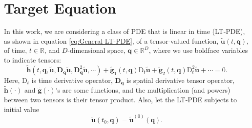 \documentclass[preprint, 12pt]{revtex4-2}
\numberwithin{equation}{section}
\begin{document}
\section{Target Equation}
In this work, we are considering a class of PDE that is linear in time (LT-PDE), as shown in equation \ref{eq:General LT-PDE}, of a tensor-valued function, $\tilde{\mathbf{u}}(t, \mathbf{q})$, of time, $t\in \mathbb{R}$, and $D$-dimensional space, $\mathbf{q}\in\mathbb{R}^D$, where we use boldface variables to indicate tensors:
\begin{equation}\label{eq:General LT-PDE}
    \tilde{\mathbf{h}}(t, \mathbf{q}, \tilde{\mathbf{u}}, \mathbf{D}_\mathbf{q}\tilde{\mathbf{u}}, \mathbf{D}_\mathbf{q}^2\tilde{\mathbf{u}}, \cdots) + \tilde{\mathbf{g}}_{1}(t, \mathbf{q})\text{D}_t\tilde{\mathbf{u}} + \tilde{\mathbf{g}}_{2}(t, \mathbf{q})\text{D}_t^2\tilde{\mathbf{u}} + \cdots = 0.
\end{equation}
Here, $\text{D}_t$ is time derivative operator, $\mathbf{D}_\mathbf{q}$ is spatial derivative tensor operator, $\tilde{\mathbf{h}}(\cdot)$ and $\tilde{\mathbf{g}}(\cdot)$'s are some functions, and the multiplication (and powers) between two tensors is their tensor product. Also, let the LT-PDE subjects to initial value 
\begin{equation}
    \tilde{\mathbf{u}}(t_0, \mathbf{q}) = \tilde{\mathbf{u}}^{(0)}(\mathbf{q}).
\end{equation}
\end{document}
